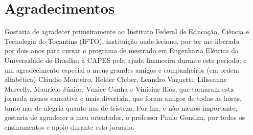 \chapter*{Agradecimentos}

Gostaria de agradecer primeiramente
ao Instituto Federal de Educação, Ciência e Tecnologia do Tocantins (IFTO),
instituição onde leciono, por ter me liberado por dois anos
para cursar o programa de mestrado em Engenharia Elétrica
da Universidade de Brasília; à CAPES pela ajuda financeira
durante este período; e um agradecimento
especial a meus grandes amigos e companheiros (em ordem alfabética) 
Cláudio Monteiro, Helder Cleber, Leandro Vaguetti, Lilissanne Marcelly, Maurício Júnior, Vanice Cunha e Vinícius Rios,
que tornaram esta jornada menos cansativa e mais divertida, que foram amigos
de todas as horas, tanto nas de alegria quanto nas de tristeza.
Por fim, e não menos importante, gostaria de agradecer a meu orientador, o professor Paulo 
Gondim, por todos os ensinamentos e apoio durante esta jornada.

